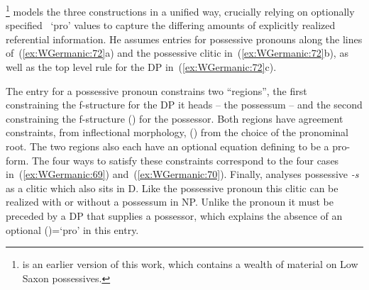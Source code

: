\documentclass[output=paper,hidelinks]{langscibook}
\begin{document}
\citet{Strunk05}\footnote{\citet{strunk04} is an
earlier version of this work, which contains a wealth of material on
Low Saxon possessives.} models the three constructions in a unified
way, crucially relying on optionally specified \PRED~`pro' values to
capture the differing amounts of explicitly realized referential
information. He assumes entries for possessive pronouns along the
lines of~(\ref{ex:WGermanic:72}a) and the possessive clitic in~(\ref{ex:WGermanic:72}b), as well as the
top level rule for the DP in~(\ref{ex:WGermanic:72}c).
%
\begin{exe}
  \ex\label{ex:WGermanic:72}
  \begin{xlist}
    \ex {}
    \ex {}
    \ex {}
  \end{xlist}
\end{exe}
%
The entry for a possessive pronoun constrains two ``regions'', the
first constraining the f-structure \UP for the DP it heads -- the
possessum -- and the second constraining the f-structure (\UP\POSS)
for the possessor. Both regions have agreement constraints, \UP from
inflectional morphology, (\UP\POSS) from the choice of the pronominal
root. The two regions also each have an optional equation defining
\PRED to be a pro-form. The four ways to satisfy these constraints
correspond to the four cases in~(\ref{ex:WGermanic:69}) and~(\ref{ex:WGermanic:70}). Finally,
\citet{Strunk05} analyses possessive \textit{-s} as a clitic which
also sits in D. Like the possessive pronoun this clitic can be
realized with or without a possessum in NP. Unlike the pronoun it must
be preceded by a DP that supplies a possessor, which explains the
absence of an optional \mbox{(\UP\POSS\PRED)=\mbox{`pro'}} in this
entry.
\end{document}
